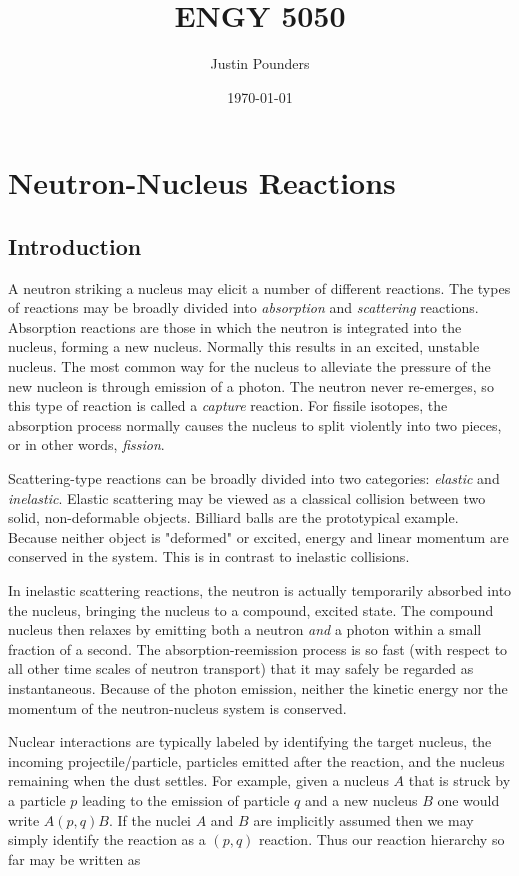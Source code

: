 \documentclass[11pt]{article}
\author{Justin Pounders}
\date{\today}
\title{ENGY 5050}
\begin{document}
\maketitle
\tableofcontents


\section{Neutron-Nucleus Reactions}
\label{sec:orgheadline13}
\subsection{Introduction}
\label{sec:orgheadline1}
A neutron striking a nucleus may elicit a number of different reactions.  The types of reactions may be broadly divided into \emph{absorption} and \emph{scattering} reactions.  Absorption reactions are those in which the neutron is integrated into the nucleus, forming a new nucleus.  Normally this results in an excited, unstable nucleus.  The most common way for the nucleus to alleviate the pressure of the new nucleon is through emission of a photon.  The neutron never re-emerges, so this type of reaction is called a \emph{capture} reaction.  For fissile isotopes, the absorption process normally causes the nucleus to split violently into two pieces, or in other words, \emph{fission}.

Scattering-type reactions can be broadly divided into two categories: \emph{elastic} and \emph{inelastic}.  Elastic scattering may be viewed as a classical collision between two solid, non-deformable objects.  Billiard balls are the prototypical example.  Because neither object is "deformed" or excited, energy and linear momentum are conserved in the system.  This is in contrast to inelastic collisions.  

In inelastic scattering reactions, the neutron is actually temporarily absorbed into the nucleus, bringing the nucleus to a compound, excited state.  The compound nucleus then relaxes by emitting both a neutron \emph{and} a photon within a small fraction of a second.  The absorption-reemission process is so fast (with respect to all other time scales of neutron transport) that it may safely be regarded as instantaneous.  Because of the photon emission, neither the kinetic energy nor the momentum of the neutron-nucleus system is conserved.

Nuclear interactions are typically labeled by identifying the target nucleus, the incoming projectile/particle, particles emitted after the reaction, and the nucleus remaining when the dust settles.  For example, given a nucleus \(A\) that is struck by a particle \(p\) leading to the emission of particle \(q\) and a new nucleus \(B\) one would write \(A(p,q)B\).  If the nuclei \(A\) and \(B\) are implicitly assumed then we may simply identify the reaction as a \((p,q)\) reaction.  Thus our reaction hierarchy so far may be written as
\end{document}

